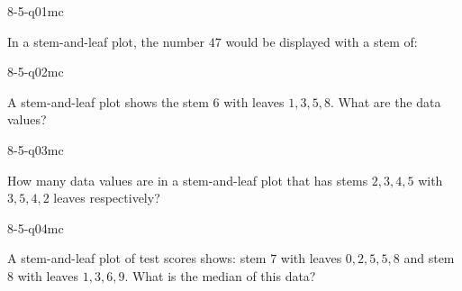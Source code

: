 

\begin{practiceQuestion}{8-5-q01}{mc}
\begin{questionText}
In a stem-and-leaf plot, the number $47$ would be displayed with a stem of:
\end{questionText}
\end{practiceQuestion}

\begin{practiceQuestion}{8-5-q02}{mc}
\begin{questionText}
A stem-and-leaf plot shows the stem $6$ with leaves $1, 3, 5, 8$. What are the data values?
\end{questionText}
\end{practiceQuestion}

\begin{practiceQuestion}{8-5-q03}{mc}
\begin{questionText}
How many data values are in a stem-and-leaf plot that has stems $2, 3, 4, 5$ with $3, 5, 4, 2$ leaves respectively?
\end{questionText}
\end{practiceQuestion}

\begin{practiceQuestion}{8-5-q04}{mc}
\begin{questionText}
A stem-and-leaf plot of test scores shows: stem $7$ with leaves $0, 2, 5, 5, 8$ and stem $8$ with leaves $1, 3, 6, 9$. What is the median of this data?
\end{questionText}
\end{practiceQuestion}

